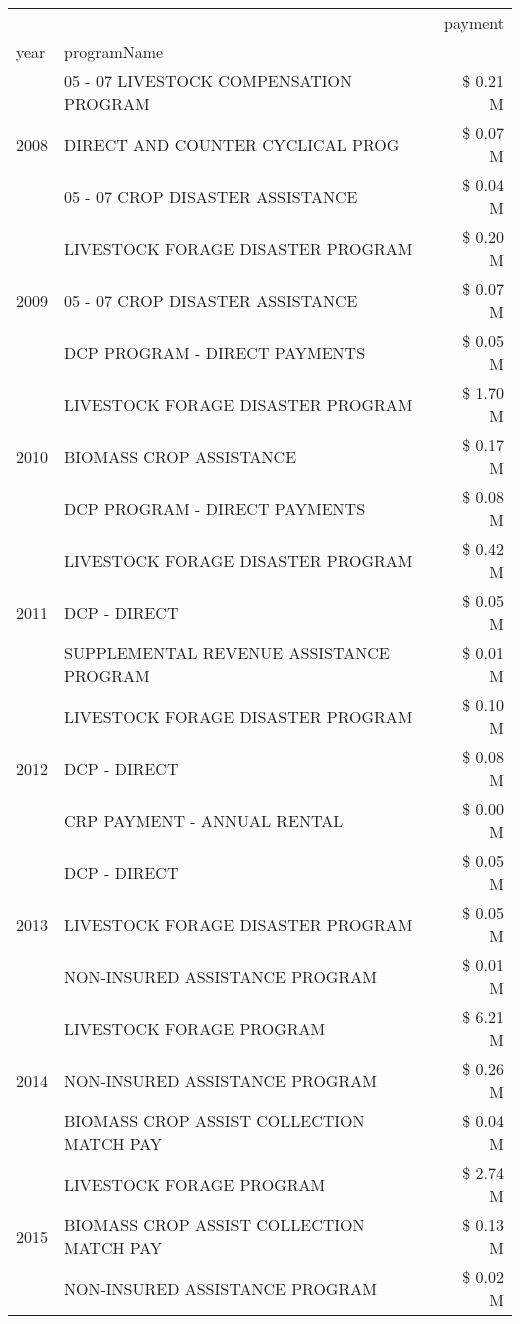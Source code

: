 \begin{tabular}{llr}
\toprule
 &  & payment \\
year & programName &  \\
\midrule
\multirow[t]{3}{*}{2008} & 05 - 07 LIVESTOCK COMPENSATION PROGRAM & \$ 0.21 M \\
 & DIRECT AND COUNTER CYCLICAL PROG & \$ 0.07 M \\
 & 05 - 07 CROP DISASTER ASSISTANCE & \$ 0.04 M \\
\cline{1-3}
\multirow[t]{3}{*}{2009} & LIVESTOCK FORAGE DISASTER  PROGRAM & \$ 0.20 M \\
 & 05 - 07 CROP DISASTER ASSISTANCE & \$ 0.07 M \\
 & DCP PROGRAM - DIRECT PAYMENTS & \$ 0.05 M \\
\cline{1-3}
\multirow[t]{3}{*}{2010} & LIVESTOCK FORAGE DISASTER  PROGRAM & \$ 1.70 M \\
 & BIOMASS CROP ASSISTANCE & \$ 0.17 M \\
 & DCP PROGRAM - DIRECT PAYMENTS & \$ 0.08 M \\
\cline{1-3}
\multirow[t]{3}{*}{2011} & LIVESTOCK FORAGE DISASTER PROGRAM & \$ 0.42 M \\
 & DCP - DIRECT & \$ 0.05 M \\
 & SUPPLEMENTAL REVENUE ASSISTANCE PROGRAM & \$ 0.01 M \\
\cline{1-3}
\multirow[t]{3}{*}{2012} & LIVESTOCK FORAGE DISASTER PROGRAM & \$ 0.10 M \\
 & DCP - DIRECT & \$ 0.08 M \\
 & CRP PAYMENT - ANNUAL RENTAL & \$ 0.00 M \\
\cline{1-3}
\multirow[t]{3}{*}{2013} & DCP - DIRECT & \$ 0.05 M \\
 & LIVESTOCK FORAGE DISASTER PROGRAM & \$ 0.05 M \\
 & NON-INSURED ASSISTANCE PROGRAM & \$ 0.01 M \\
\cline{1-3}
\multirow[t]{3}{*}{2014} & LIVESTOCK FORAGE PROGRAM & \$ 6.21 M \\
 & NON-INSURED ASSISTANCE PROGRAM & \$ 0.26 M \\
 & BIOMASS CROP ASSIST COLLECTION MATCH PAY & \$ 0.04 M \\
\cline{1-3}
\multirow[t]{3}{*}{2015} & LIVESTOCK FORAGE PROGRAM & \$ 2.74 M \\
 & BIOMASS CROP ASSIST COLLECTION MATCH PAY & \$ 0.13 M \\
 & NON-INSURED ASSISTANCE PROGRAM & \$ 0.02 M \\
\cline{1-3}

\end{tabular}

